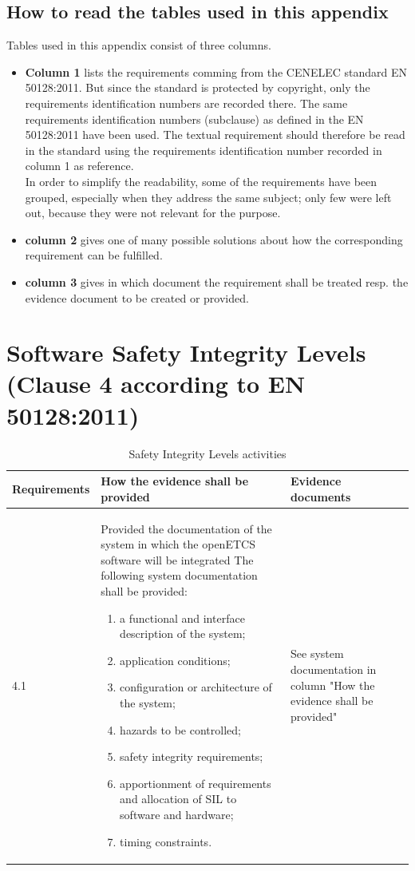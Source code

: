 \documentclass{template/openetcs_report}
\begin{document}
\subsection{How to read the tables used in this appendix}
Tables used in this appendix consist of three columns.
\begin{itemize}\itemsep=0pt
  \item \textbf{Column 1} lists the requirements comming from the CENELEC standard EN 50128:2011. But since the standard is protected by copyright, only the requirements identification numbers are recorded there. The same requirements identification numbers (subclause) as defined in the EN 50128:2011 have been used. The textual requirement should therefore be read in the standard using the requirements identification number recorded in column 1 as reference.\\
In order to simplify the readability, some of the requirements have been grouped, especially when they address the same subject; only few were left out, because they were not relevant for the purpose.
  \item \textbf{column 2} gives one of many possible solutions about how the corresponding requirement can be fulfilled.
  \item \textbf{column 3} gives in which document the requirement shall be treated resp. the evidence document to be created or provided.
\end{itemize}


\section{Software Safety Integrity Levels (Clause 4 according to EN 50128:2011)}
\label{clause42}
{\footnotesize\sffamily\centering
\begin{longtable}{|p{2cm}|p{9cm}|p{3cm}|}
\caption{Safety Integrity Levels activities}\\
\hline
\bfseries Requirements & \bfseries How the evidence shall be provided & \bfseries Evidence documents\\
\hline
\hline
\endhead
\hline
\endfoot

4.1 & Provided the documentation of the system in which the openETCS software will be integrated 
The following system documentation shall be provided:
\begin{enumerate}\itemsep=0pt
  \item a functional and interface description of the system;
  \item application conditions;
  \item configuration or architecture of the system;
  \item hazards to be controlled;
  \item safety integrity requirements;
  \item apportionment of requirements and allocation of SIL to software and hardware;
  \item timing constraints.
\end{enumerate} & See system documentation in column "How the evidence shall be provided"\\ 
\hline
\end{longtable}}
\end{document}
